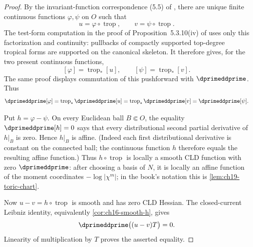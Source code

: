 \begin{proof}
By the invariant-function correspondence (5.5) of \cite{BGJKK25}, there
are unique finite continuous functions $\varphi,\psi$ on $O$ such that
\[
 u=\varphi\circ\operatorname{trop},\qquad
 v=\psi\circ\operatorname{trop}.
\]
The test-form computation in the proof of Proposition~5.3.10(iv) of
\cite{BGJKK25} uses only this factorization and continuity: pullbacks of
compactly supported top-degree tropical forms are supported on the canonical
skeleton.  It therefore gives, for the two present continuous functions,
\[
 [\varphi]=\operatorname{trop}_*[u],\qquad
 [\psi]=\operatorname{trop}_*[v].
\]
The same proof displays commutation of this pushforward with
$\dprimeddprime$.  Thus
\[
 \dprimeddprime[\varphi]
 =\operatorname{trop}_*\dprimeddprime[u]
 =\operatorname{trop}_*\dprimeddprime[v]
 =\dprimeddprime[\psi].
\]

Put $h=\varphi-\psi$.  On every Euclidean ball $B\Subset O$, the equality
$\dprimeddprime[h]=0$ says that every distributional second partial
derivative of $h|_B$ is zero.  Hence $h|_B$ is affine.  (Indeed each first
distributional derivative is constant on the connected ball; the continuous
function $h$ therefore equals the resulting affine function.)  Thus
$h\circ\operatorname{trop}$ is locally a smooth CLD function with zero
$\dprimeddprime$: after choosing a basis of $N$, it is locally an affine
function of the moment coordinates $-\log|\chi^m|$; in the book's notation
this is \cref{lem:ch19-toric-chart}.

Now $u-v=h\circ\operatorname{trop}$ is smooth and has zero CLD Hessian.
The closed-current Leibniz identity, equivalently
\cref{cor:ch16-smooth-h}, gives
\[
 \dprimeddprime\bigl((u-v)T\bigr)=0.
\]
Linearity of multiplication by $T$ proves the asserted equality.
\end{proof}
